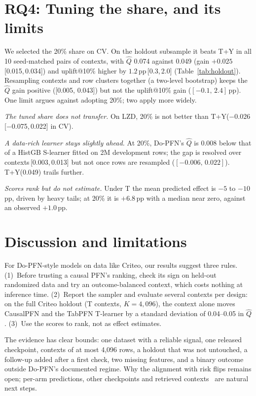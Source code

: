 \documentclass[sigconf,anonymous,review]{acmart}
\DeclareRobustCommand{\dopfn}{\mbox{Do-PFN}\xspace}
\newcommand{\Qhat}{\ensuremath{\hat Q}\xspace}
\newcommand{\TY}{T+Y\xspace}
\newcommand{\pp}{\,pp\xspace}
\newcommand{\ci}[2]{\,[#1,\,#2]}
\begin{document}
\section{RQ4: Tuning the share, and its limits}

We selected the 20\% share on CV. On the holdout subsample it beats \TY in all 10 seed-matched pairs of contexts, with \Qhat 0.074 against 0.049 (gain $+0.025$\ci{0.015}{0.034}) and uplift@10\% higher by $1.2$\pp{}\ci{0.3}{2.0} (\mbox{Table}~\ref{tab:holdout}). Resampling contexts and row clusters together (a two-level bootstrap) keeps the \Qhat gain positive ([0.005, 0.043]) but not the uplift@10\% gain ($[-0.1,\,2.4]$\pp). One limit argues against adopting 20\%; two apply more widely.

\emph{The tuned share does not transfer.} On LZD, 20\% is not better than \TY ($-0.026$\ci{$-$0.075}{0.022} in CV).

\emph{A data-rich learner stays slightly ahead.} At 20\%, \dopfn's \Qhat is 0.008 below that of a HistGB S-learner fitted on 2M development rows; the gap is resolved over contexts\ci{0.003}{0.013} but not once rows are resampled ($[-0.006,\,0.022]$). \TY (0.049) trails further.

\emph{Scores rank but do not estimate.} Under T the mean predicted effect is $-5$ to $-10$\pp, driven by heavy tails; at 20\% it is $+6.8$\pp with a median near zero, against an observed $+1.0$\pp.

\section{Discussion and limitations}

For \dopfn-style models on data like Criteo, our results suggest three rules.
(1)~Before trusting a causal PFN's ranking, check its sign on held-out randomized data and try an outcome-balanced context, which costs nothing at inference time.
(2)~Report the sampler and evaluate several contexts per design: on the full Criteo holdout (T contexts, $K{=}4{,}096$), the context alone moves CausalPFN and the TabPFN T-learner by a standard deviation of 0.04--0.05 in \Qhat.
(3)~Use the scores to rank, not as effect estimates.

The evidence has clear bounds: one dataset with a reliable signal, one released checkpoint, contexts of at most 4,096 rows, a holdout that was not untouched, a follow-up added after a first check, two missing features, and a binary outcome outside \dopfn's documented regime. Why the alignment with risk flips remains open; per-arm predictions, other checkpoints and retrieved contexts~\cite{thomas2024retrieval} are natural next steps.
\end{document}
